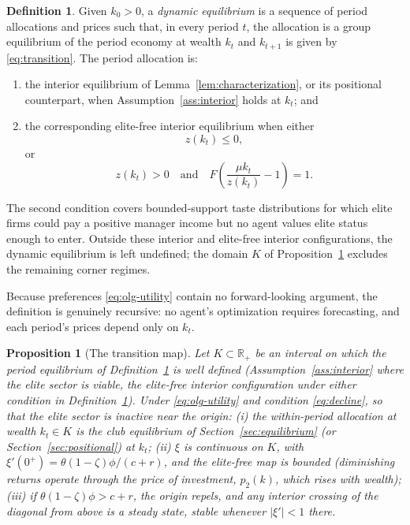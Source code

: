 \documentclass[12pt,letterpaper]{article}
\newtheorem{proposition}{Proposition}
\theoremstyle{definition}
\newtheorem{definition}{Definition}
\newcommand{\R}{\mathbb{R}}
\begin{document}
\begin{definition}\label{def:dynamiceq}
Given $k_0>0$, a \emph{dynamic equilibrium} is a sequence of period allocations and prices such that, in every period $t$, the allocation is a group equilibrium of the period economy at wealth $k_t$ and $k_{t+1}$ is given by \eqref{eq:transition}.
The period allocation is:
\begin{enumerate}
\item the interior equilibrium of Lemma~\ref{lem:characterization}, or its positional counterpart, when Assumption~\ref{ass:interior} holds at $k_t$; and
\item the corresponding elite-free interior equilibrium when either
\[
  z(k_t)\leq0,
\]
or
\[
  z(k_t)>0
  \quad\text{and}\quad
  F\!\left(\frac{\mu k_t}{z(k_t)}-1\right)=1.
\]
\end{enumerate}
The second condition covers bounded-support taste distributions for which elite firms could pay a positive manager income but no agent values elite status enough to enter.
Outside these interior and elite-free interior configurations, the dynamic equilibrium is left undefined; the domain $K$ of Proposition~\ref{prop:map} excludes the remaining corner regimes.
\end{definition}

Because preferences \eqref{eq:olg-utility} contain no forward-looking argument, the definition is genuinely recursive: no agent's optimization requires forecasting, and each period's prices depend only on $k_t$.

\begin{proposition}[The transition map]\label{prop:map} Let $K\subset\R_+$ be an interval on which the period equilibrium of Definition~\ref{def:dynamiceq} is well defined (Assumption~\ref{ass:interior} where the elite sector is viable, the elite-free interior configuration under either condition in Definition~\ref{def:dynamiceq}).
Under \eqref{eq:olg-utility} and condition \eqref{eq:decline}, so that the elite sector is inactive near the origin: (i) the within-period allocation at wealth $k_t\in K$ is the club equilibrium of Section~\ref{sec:equilibrium} (or Section~\ref{sec:positional}) at $k_t$; (ii) $\xi$ is continuous on $K$, with $\xi'(0^+)=\theta(1-\zeta)\phi/(c+r)$, and the elite-free map is bounded (diminishing returns operate through the price of investment, $p_2(k)$, which rises with wealth); (iii) if $\theta(1-\zeta)\phi>c+r$, the origin repels, and any interior crossing of the diagonal from above is a steady state, stable whenever $|\xi'|<1$ there.
\end{proposition}
\end{document}
